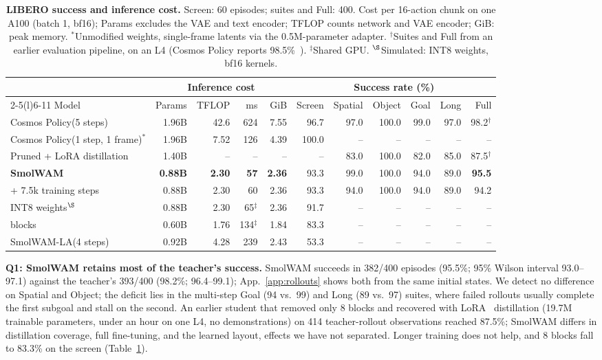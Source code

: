 \documentclass{article}
\newcommand{\smol}{SmolWAM\xspace}
\newcommand{\smolla}{SmolWAM-LA\xspace}
\newcommand{\cosmos}{Cosmos Policy\xspace}
\begin{document}
\begin{table}[t]
\centering
\caption{\textbf{LIBERO success and inference cost.} Screen: 60 episodes; suites and Full: 400. Cost per 16-action chunk on one A100 (batch 1, bf16); Params excludes the VAE and text encoder; TFLOP counts network and VAE encoder; GiB: peak memory. $^\ast$Unmodified weights, single-frame latents via the 0.5M-parameter adapter. $^\dagger$Suites and Full from an earlier evaluation pipeline, on an L4 (\cosmos reports 98.5\%~\citep{kim2026cosmospolicy}). $^\ddagger$Shared GPU. $^\S$Simulated: INT8 weights, bf16 kernels.}
\label{tab:main}
\small
\setlength{\tabcolsep}{2.85pt}
\begin{tabular}{@{}lrrrrrrrrrr@{}}
\toprule
& \multicolumn{4}{c}{Inference cost} & \multicolumn{6}{c}{Success rate (\%)} \\
\cmidrule(lr){2-5}\cmidrule(l){6-11}
Model & Params & TFLOP & ms & GiB & Screen & Spatial & Object & Goal & Long & Full \\
\midrule
\cosmos (5 steps) & 1.96B & 42.6 & 624 & 7.55 & 96.7 & 97.0 & 100.0 & 99.0 & 97.0 & 98.2$^\dagger$ \\
\cosmos (1 step, 1 frame)$^\ast$ & 1.96B & 7.52 & 126 & 4.39 & 100.0 & -- & -- & -- & -- & -- \\
Pruned + LoRA distillation & 1.40B & -- & -- & -- & -- & 83.0 & 100.0 & 82.0 & 85.0 & 87.5$^\dagger$ \\
\midrule
\textbf{\smol} & \textbf{0.88B} & \textbf{2.30} & \textbf{57} & \textbf{2.36} & 93.3 & 99.0 & 100.0 & 94.0 & 89.0 & \textbf{95.5} \\
\quad + 7.5k training steps & 0.88B & 2.30 & 60 & 2.36 & 93.3 & 94.0 & 100.0 & 94.0 & 89.0 & 94.2 \\
\quad INT8 weights$^\S$ & 0.88B & 2.30 & 65$^\ddagger$ & 2.36 & 91.7 & -- & -- & -- & -- & -- \\
\quad 8 blocks & 0.60B & 1.76 & 134$^\ddagger$ & 1.84 & 83.3 & -- & -- & -- & -- & -- \\
\smolla (4 steps) & 0.92B & 4.28 & 239 & 2.43 & 53.3 & -- & -- & -- & -- & -- \\
\bottomrule
\end{tabular}
\end{table}

\textbf{Q1: \smol retains most of the teacher's success.}
\smol succeeds in 382/400 episodes (95.5\%; 95\% Wilson interval 93.0--97.1) against the teacher's 393/400 (98.2\%; 96.4--99.1); App.~\ref{app:rollouts} shows both from the same initial states.
We detect no difference on Spatial and Object; the deficit lies in the multi-step Goal (94 vs.\ 99) and Long (89 vs.\ 97) suites, where failed rollouts usually complete the first subgoal and stall on the second.
An earlier student that removed only 8 blocks and recovered with LoRA~\citep{hu2022lora} distillation (19.7M trainable parameters, under an hour on one L4, no demonstrations) on 414 teacher-rollout observations reached 87.5\%; \smol differs in distillation coverage, full fine-tuning, and the learned layout, effects we have not separated.
Longer training does not help, and 8 blocks fall to 83.3\% on the screen (Table~\ref{tab:main}).
\end{document}
